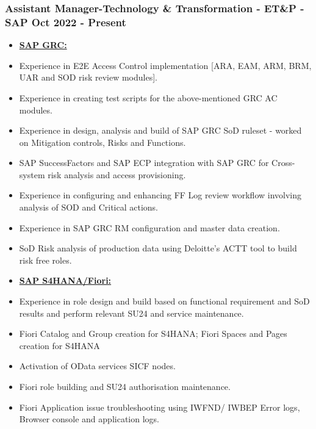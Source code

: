 \documentclass[10pt]{article}
\begin{document}
\subsubsection{Assistant Manager-Technology \& Transformation - ET\&P - SAP \hfill  Oct 2022 - Present \\}
\begin{itemize}
	\small
    	\item[] \textbf{\underline{SAP GRC:}}
			\item Experience in E2E Access Control implementation [ARA, EAM, ARM, BRM, UAR and SOD risk review modules].
			\item Experience in creating test scripts for the above-mentioned GRC AC modules.
			\item Experience in design, analysis and build of SAP GRC SoD ruleset - worked on Mitigation controls, Risks and Functions.
			\item SAP SuccessFactors and SAP ECP integration with SAP GRC for Cross-system risk analysis and access provisioning.
			\item Experience in configuring and enhancing FF Log review workflow involving analysis of SOD and Critical actions.
			\item Experience in SAP GRC RM configuration and master data creation.
			\item SoD Risk analysis of production data using Deloitte's ACTT tool to build risk free roles.
\end{itemize}

\begin{itemize}
	\small
    	\item[] \textbf{\underline{SAP S4HANA/Fiori:}}
			\item Experience in role design and build based on functional requirement and SoD results and perform relevant SU24 and service maintenance.
			\item Fiori Catalog and Group creation for S4HANA; Fiori Spaces and Pages creation for S4HANA
			\item Activation of OData services SICF nodes.
			\item Fiori role building and SU24 authorisation maintenance.
			\item Fiori Application issue troubleshooting using IWFND/ IWBEP Error logs, Browser console and application logs.
\end{itemize}
\end{document}
